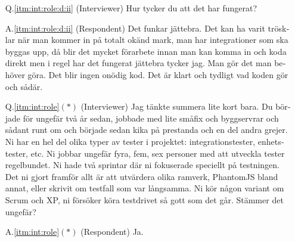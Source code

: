 \begin{otherlanguage}{swedish}
\begin{itemize}
  \item[Q.\ref{itm:int:role:d:ii}] (Interviewer) Hur tycker du att det har fungerat?
  \item[A.\ref{itm:int:role:d:ii}] (Respondent) Det funkar jättebra. Det kan ha varit trösklar när man kommer in på totalt okänd mark, man har integrationer som ska byggas upp, då blir det mycket förarbete innan man kan komma in och koda direkt men i regel har det fungerat jättebra tycker jag. Man gör det man behöver göra. Det blir ingen onödig kod. Det är klart och tydligt vad koden gör och sådär.
  \item[Q.\ref{itm:int:role}$(*)$] (Interviewer) Jag tänkte summera lite kort bara. Du började för ungefär två år sedan, jobbade med lite småfix och byggservrar och sådant runt om och började sedan kika på prestanda och en del andra grejer. Ni har en hel del olika typer av tester i projektet: integrationstester, enhetstester, etc. Ni jobbar ungefär fyra, fem, sex personer med att utveckla tester regelbundet. Ni hade två sprintar där ni fokuserade speciellt på testningen. Det ni gjort framför allt är att utvärdera olika ramverk, PhantomJS bland annat, eller skrivit om testfall som var långsamma. Ni kör någon variant om Scrum och XP, ni försöker köra testdrivet så gott som det går. Stämmer det ungefär?
  \item[A.\ref{itm:int:role}$(*)$] (Respondent) Ja.

\noindent\makebox[\linewidth]{\rule{\textwidth}{0.4pt}}
  

\end{itemize}
\end{otherlanguage}
